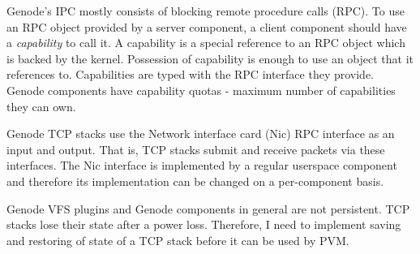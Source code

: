 Genode's IPC mostly consists of blocking remote procedure calls (RPC). To use
an RPC object provided by a server component, a client component should have a
\textit{capability} to call it. A capability is a special reference to an RPC
object which is backed by the kernel. Possession of capability is enough to use
an object that it references to. Capabilities are typed with the RPC interface
they provide. Genode components have capability quotas - maximum number of
capabilities they can own.

Genode TCP stacks use the Network interface card (Nic) RPC interface as an
input and output. That is, TCP stacks submit and receive packets via these
interfaces. The Nic interface is implemented by a regular userspace component
and therefore its implementation can be changed on a per-component basis.

Genode VFS plugins and Genode components in general are not persistent. TCP
stacks lose their state after a power loss. Therefore, I need to implement
saving and restoring of state of a TCP stack before it can be used by PVM.
